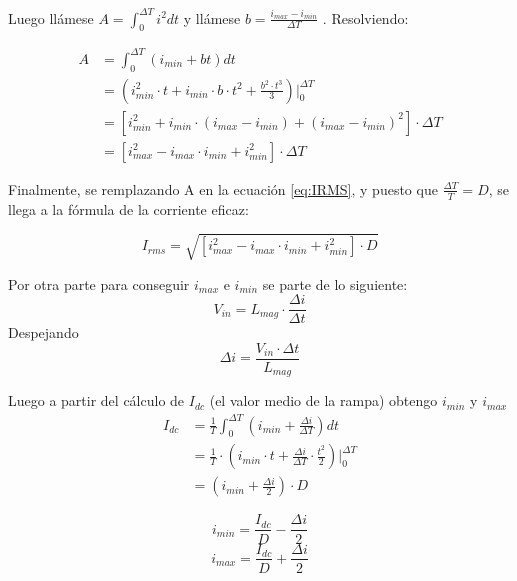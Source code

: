 \documentclass{article}
\begin{document}
Luego llámese $A= \int_{0}^{\Delta T}{i^2 dt}$ y llámese $b=\frac{i_{max}-i_{min}}{\Delta T}$ . Resolviendo:

\begin{align*}
    A &=\int_{0}^{\Delta T}{(i_{min}+bt)dt}\\
    &=(i_{min}^2\cdot t + i_{min} \cdot b \cdot t^2 + \frac{b^2 \cdot t^3}{3})\Big|_{0}^{\Delta T}\\
    &=\left[i_{min}^2 + i_{min}\cdot (i_{max}-i_{min}) + {(i_{max}-i_{min})}^2 \right] \cdot \Delta T\\
    &=\left[i_{max}^2 - i_{max} \cdot i_{min} + i_{min}^2 \right] \cdot \Delta T
\end{align*}

Finalmente, se remplazando A en la ecuación \ref{eq:IRMS}, y puesto que $ \frac{\Delta T}{T}=D $, se llega a la fórmula de la corriente eficaz:

\begin{equation}
    I_{rms}=  \sqrt{ \left[i_{max}^2 - i_{max} \cdot i_{min} + i_{min}^2\right] \cdot D } 
    \label{eq:IRMSprecisa}
\end{equation}

Por otra parte para conseguir $i_{max}$ e $i_{min}$ se parte de lo siguiente:
\begin{equation*}
    V_{in} = L_{mag} \cdot \frac{\Delta i}{\Delta t}
\end{equation*}
Despejando 
\begin{equation}
    \Delta i = \frac{V_{in} \cdot \Delta t}{L_{mag}}
    \label{eq:deltaI}
\end{equation}

Luego a partir del cálculo de $I_{dc}$ (el valor medio de la rampa) obtengo $ i_{min} $ y $ i_{max} $
\begin{align*}
    I_{dc} &= \frac{1}{T} \int_{0}^{\Delta T}{(i_{min} + \frac{\Delta i}{\Delta T})dt}\\
    &= \frac{1}{T} \cdot (i_{min} \cdot t + \frac{\Delta i}{\Delta T} \cdot \frac{t^2}{2}) \Big|_{0}^{\Delta T} \\
    &= (i_{min} + \frac{\Delta i}{2}) \cdot D
\end{align*}

\begin{equation}
    i_{min}= \frac{I_{dc}}{D} - \frac{\Delta i}{2}
    \label{eq:Imin}
\end{equation}
\begin{equation}
    i_{max}= \frac{I_{dc}}{D} + \frac{\Delta i}{2}
    \label{eq:Imax}
\end{equation}
\end{document}
